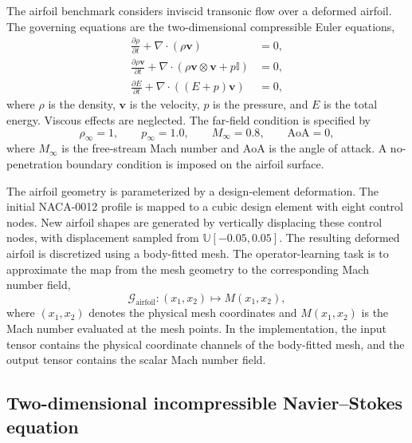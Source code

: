 \documentclass{article}
\newcommand{\I}{\mathbb{I}}
\begin{document}
The airfoil benchmark considers inviscid transonic flow over a deformed airfoil. 
The governing equations are the two-dimensional compressible Euler equations,
\begin{align}
    \frac{\partial \rho}{\partial t}
    + \nabla\cdot(\rho \bm{v})
    &= 0,
    \label{eq:app-airfoil-mass}
    \\
    \frac{\partial \rho\bm{v}}{\partial t}
    + \nabla\cdot\left(\rho\bm{v}\otimes\bm{v}+p\I\right)
    &= 0,
    \label{eq:app-airfoil-momentum}
    \\
    \frac{\partial E}{\partial t}
    + \nabla\cdot\left((E+p)\bm{v}\right)
    &= 0,
    \label{eq:app-airfoil-energy}
\end{align}
where $\rho$ is the density, $\bm{v}$ is the velocity, $p$ is the pressure, and $E$ is the total energy. 
Viscous effects are neglected. 
The far-field condition is specified by
\begin{equation}
    \rho_{\infty}=1,\qquad
    p_{\infty}=1.0,\qquad
    M_{\infty}=0.8,\qquad
    \mathrm{AoA}=0,
    \label{eq:app-airfoil-farfield}
\end{equation}
where $M_{\infty}$ is the free-stream Mach number and $\mathrm{AoA}$ is the angle of attack. 
A no-penetration boundary condition is imposed on the airfoil surface.

The airfoil geometry is parameterized by a design-element deformation. 
The initial NACA-0012 profile is mapped to a cubic design element with eight control nodes. 
New airfoil shapes are generated by vertically displacing these control nodes, with displacement sampled from $\mathbb{U}[-0.05,0.05]$.
The resulting deformed airfoil is discretized using a body-fitted mesh.
The operator-learning task is to approximate the map from the mesh geometry to the corresponding Mach number field,
\begin{equation}
    \mathcal{G}_{\mathrm{airfoil}}:
    (x_1, x_2) \mapsto M(x_1, x_2),
    \label{eq:app-airfoil-map}
\end{equation}
where $(x_1, x_2)$ denotes the physical mesh coordinates and $M(x_1, x_2)$ is the Mach number evaluated at the mesh points. 
In the implementation, the input tensor contains the physical coordinate channels of the body-fitted mesh, and the output tensor contains the scalar Mach number field.

\subsection{Two-dimensional incompressible Navier--Stokes equation}
\label{app:navier-stokes}
\end{document}
